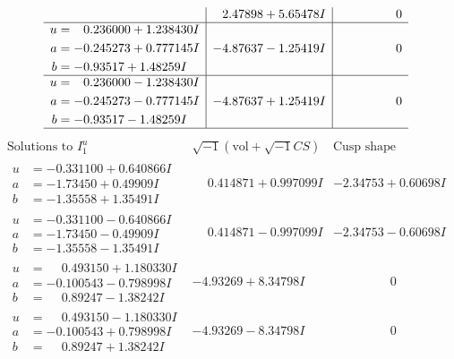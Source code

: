 \documentclass[1p]{elsarticle_modified}
\theoremstyle{definition}
\newcommand{\I}{\sqrt{-1}}
\begin{document}
$$\begin{array}{c|c|c}
 & \phantom{-}2.47898 + 5.65478 I & \phantom{-0.000000 } 0 \\ \hline\begin{aligned}
u &= \phantom{-}0.236000 + 1.238430 I \\
a &= -0.245273 + 0.777145 I \\
b &= -0.93517 + 1.48259 I\end{aligned}
 & -4.87637 - 1.25419 I & \phantom{-0.000000 } 0 \\ \hline\begin{aligned}
u &= \phantom{-}0.236000 - 1.238430 I \\
a &= -0.245273 - 0.777145 I \\
b &= -0.93517 - 1.48259 I\end{aligned}
 & -4.87637 + 1.25419 I & \phantom{-0.000000 } 0\\
 \hline 
 \end{array}$$\newpage$$\begin{array}{c|c|c}  
\text{Solutions to }I^u_{1}& \I (\text{vol} + \sqrt{-1}CS) & \text{Cusp shape}\\
 \hline 
\begin{aligned}
u &= -0.331100 + 0.640866 I \\
a &= -1.73450 + 0.49909 I \\
b &= -1.35558 + 1.35491 I\end{aligned}
 & \phantom{-}0.414871 + 0.997099 I & -2.34753 + 0.60698 I \\ \hline\begin{aligned}
u &= -0.331100 - 0.640866 I \\
a &= -1.73450 - 0.49909 I \\
b &= -1.35558 - 1.35491 I\end{aligned}
 & \phantom{-}0.414871 - 0.997099 I & -2.34753 - 0.60698 I \\ \hline\begin{aligned}
u &= \phantom{-}0.493150 + 1.180330 I \\
a &= -0.100543 - 0.798998 I \\
b &= \phantom{-}0.89247 - 1.38242 I\end{aligned}
 & -4.93269 + 8.34798 I & \phantom{-0.000000 } 0 \\ \hline\begin{aligned}
u &= \phantom{-}0.493150 - 1.180330 I \\
a &= -0.100543 + 0.798998 I \\
b &= \phantom{-}0.89247 + 1.38242 I\end{aligned}
 & -4.93269 - 8.34798 I & \phantom{-0.000000 } 0 \\ \hline\begin{aligned}

\end{aligned}
\end{array}$$
\end{document}
